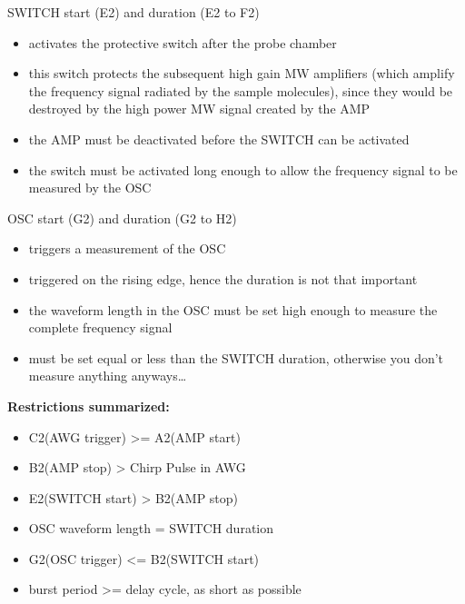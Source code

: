 SWITCH start (E2) and duration (E2 to F2)

\begin{itemize}
\item
  activates the protective switch after the probe chamber
\item
  this switch protects the subsequent high gain MW amplifiers (which
  amplify the frequency signal radiated by the sample molecules), since
  they would be destroyed by the high power MW signal created by the AMP
\item
  the AMP must be deactivated before the SWITCH can be activated
\item
  the switch must be activated long enough to allow the frequency signal
  to be measured by the OSC
\end{itemize}

OSC start (G2) and duration (G2 to H2)

\begin{itemize}
\item
  triggers a measurement of the OSC
\item
  triggered on the rising edge, hence the duration is not that important
\item
  the waveform length in the OSC must be set high enough to measure the
  complete frequency signal
\item
  must be set equal or less than the SWITCH duration, otherwise you
  don't measure anything anyways\ldots{}
\end{itemize}

\textbf{Restrictions summarized:}

\begin{itemize}
\item
  C2(AWG trigger) \textgreater{}= A2(AMP start)
\item
  B2(AMP stop) \textgreater{} Chirp Pulse in AWG
\item
  E2(SWITCH start) \textgreater{} B2(AMP stop)
\item
  OSC waveform length = SWITCH duration
\item
  G2(OSC trigger) \textless{}= B2(SWITCH start)
\item
  burst period \textgreater{}= delay cycle, as short as possible
\end{itemize}
